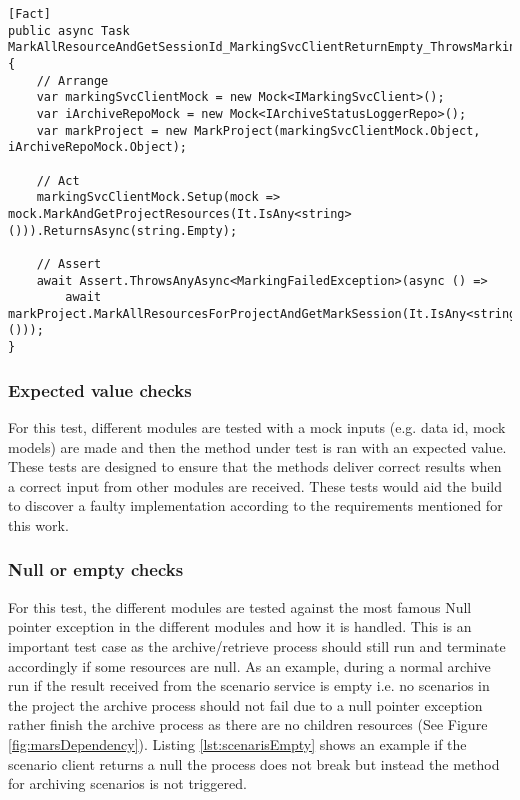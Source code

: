 \newpage
\begin{lstlisting}[language={[Sharp]C}, caption={Exception catch test example}, captionpos=b,label={lst:exceptionCatch}]
[Fact]
public async Task MarkAllResourceAndGetSessionId_MarkingSvcClientReturnEmpty_ThrowsMarkingFailedException()
{
    // Arrange
    var markingSvcClientMock = new Mock<IMarkingSvcClient>();
    var iArchiveRepoMock = new Mock<IArchiveStatusLoggerRepo>();
    var markProject = new MarkProject(markingSvcClientMock.Object, iArchiveRepoMock.Object);
    
    // Act 
    markingSvcClientMock.Setup(mock => mock.MarkAndGetProjectResources(It.IsAny<string>())).ReturnsAsync(string.Empty);
    
    // Assert
    await Assert.ThrowsAnyAsync<MarkingFailedException>(async () =>
        await markProject.MarkAllResourcesForProjectAndGetMarkSession(It.IsAny<string>()));
}
\end{lstlisting}

\subsubsection{Expected value checks}
For this test, different modules are tested with a mock inputs (e.g. data id, mock models) are made and then the method under test is ran with an 
expected value. These tests are designed to ensure that the methods deliver correct results when a correct input from other modules are received.
These tests would aid the build to discover a faulty implementation according to the requirements mentioned for this work.

\subsubsection{Null or empty checks}
For this test, the different modules are tested against the most famous Null pointer exception in the different modules and how it is handled. This is an important
test case as the archive/retrieve process should still run and terminate accordingly if some resources are null. As an example, during a normal archive run if the result received from
the scenario service  is empty i.e. no scenarios in the project the archive process should not fail due to a null pointer exception rather finish the archive process
as there are no children resources (See Figure \ref{fig:marsDependency}). Listing \ref{lst:scenarisEmpty} shows an example if the scenario client returns a null 
the process does not break but instead the method for archiving scenarios is not triggered. 

